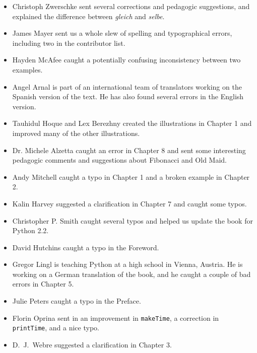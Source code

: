 \documentclass[10pt]{book}
\begin{document}
\begin{itemize}
\item Christoph Zwerschke sent several corrections and
pedagogic suggestions, and explained the difference between {\em gleich}
and {\em selbe}.

\item James Mayer sent us a whole slew of spelling and
typographical errors, including two in the contributor list.

\item Hayden McAfee caught a potentially confusing inconsistency
between two examples.

\item Angel Arnal is part of an international team of translators
working on the Spanish version of the text.  He has also found several
errors in the English version.

\item Tauhidul Hoque and Lex Berezhny created the illustrations
in Chapter 1 and improved many of the other illustrations.

\item Dr. Michele Alzetta caught an error in Chapter 8 and sent
some interesting pedagogic comments and suggestions about Fibonacci
and Old Maid.

\item Andy Mitchell caught a typo in Chapter 1 and a broken example
in Chapter 2.

\item Kalin Harvey suggested a clarification in Chapter 7 and
caught some typos.

\item Christopher P. Smith caught several typos and helped us
update the book for Python 2.2.

\item David Hutchins caught a typo in the Foreword.

\item Gregor Lingl is teaching Python at a high school in Vienna,
Austria.  He is working on a German translation of the book,
and he caught a couple of bad errors in Chapter 5.

\item Julie Peters caught a typo in the Preface.

\item Florin Oprina sent in an improvement in {\tt makeTime},
a correction in {\tt printTime}, and a nice typo.

\item D.~J.~Webre suggested a clarification in Chapter 3.


\end{itemize}
\end{document}
